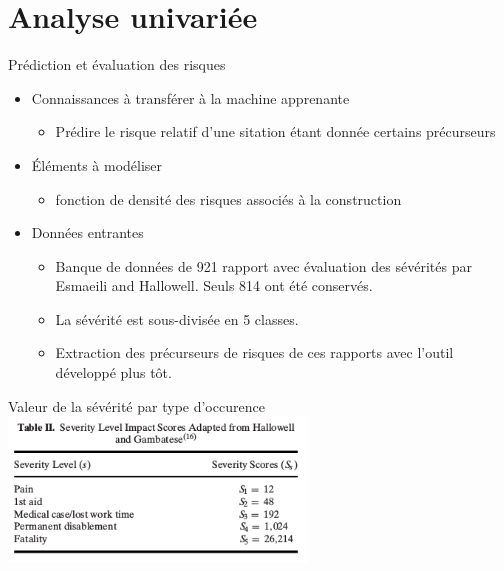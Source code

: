 \section{Analyse univariée}

\begin{frame}
	Prédiction et évaluation des risques
	\begin{itemize}
		\item Connaissances à transférer à la machine apprenante
		\begin{itemize}
			\item Prédire le risque relatif d'une sitation étant donnée certains précurseurs
		\end{itemize}	
		
		\item Éléments à modéliser
		\begin{itemize}
			\item fonction de densité des risques associés à la construction
		\end{itemize}	
	\end{itemize}
\end{frame}


\begin{frame}
	\begin{itemize}
	\item Données entrantes
	\begin{itemize}
		\item Banque de données de 921 rapport avec évaluation des sévérités par Esmaeili and Hallowell. Seuls 814 ont été conservés.
		\item La sévérité est sous-divisée en 5 classes.
		\item Extraction des précurseurs de risques de ces rapports avec l'outil développé plus tôt.
		\end{itemize}	
	\end{itemize}

	Valeur de la sévérité par type d'occurence
	\includegraphics[width=300px]{table_severite}
\end{frame}

